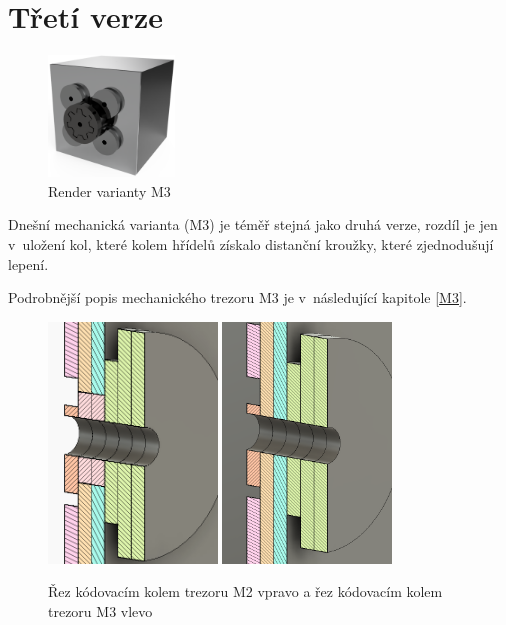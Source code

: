 \section{Třetí verze}
\label{M3-vyvoj}

\begin{figure}
    \centering
    \includegraphics[width=0.3\textwidth]{kapitoly/obrazky/M3/predni_render.png}
    \caption{Render varianty M3}
    \label{fig:M3-miny-render}
\end{figure}

Dnešní mechanická varianta (M3) je téměř stejná jako druhá verze, rozdíl je jen v~uložení kol, které kolem hřídelů získalo distanční kroužky, které
zjednodušují lepení. 

Podrobnější popis mechanického trezoru M3 je v~následující kapitole \ref{M3}. 

\begin{figure}[h]
    \centering
    \vspace{40mm}
    \includegraphics[width=0.4\textwidth]{kapitoly/obrazky/M3/rez.png}
    \includegraphics[width=0.4\textwidth]{kapitoly/obrazky/M2/rez.png}
    \caption{Řez kódovacím kolem trezoru M2 vpravo a řez kódovacím kolem trezoru M3 vlevo \centering}
    \label{fig:M3-rez-kolem}
\end{figure}

\newpage